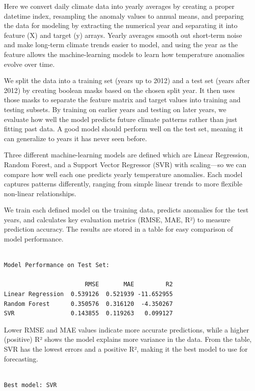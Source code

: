 \documentclass[
  letterpaper,
  DIV=11,
  numbers=noendperiod]{scrartcl}
\begin{document}
Here we convert daily climate data into yearly averages by creating a
proper datetime index, resampling the anomaly values to annual means,
and preparing the data for modeling by extracting the numerical year and
separating it into feature (X) and target (y) arrays. Yearly averages
smooth out short-term noise and make long-term climate trends easier to
model, and using the year as the feature allows the machine-learning
models to learn how temperature anomalies evolve over time.

We split the data into a training set (years up to 2012) and a test set
(years after 2012) by creating boolean masks based on the chosen split
year. It then uses those masks to separate the feature matrix and target
values into training and testing subsets. By training on earlier years
and testing on later years, we evaluate how well the model predicts
future climate patterns rather than just fitting past data. A good model
should perform well on the test set, meaning it can generalize to years
it has never seen before.

Three different machine-learning models are defined which are Linear
Regression, Random Forest, and a Support Vector Regressor (SVR) with
scaling---so we can compare how well each one predicts yearly
temperature anomalies. Each model captures patterns differently, ranging
from simple linear trends to more flexible non-linear relationships.

We train each defined model on the training data, predicts anomalies for
the test years, and calculates key evaluation metrics (RMSE, MAE, R²) to
measure prediction accuracy. The results are stored in a table for easy
comparison of model performance.

\begin{verbatim}

Model Performance on Test Set:

                       RMSE       MAE         R2
Linear Regression  0.539126  0.521939 -11.652955
Random Forest      0.350576  0.316120  -4.350267
SVR                0.143855  0.119263   0.099127
\end{verbatim}

Lower RMSE and MAE values indicate more accurate predictions, while a
higher (positive) R² shows the model explains more variance in the data.
From the table, SVR has the lowest errors and a positive R², making it
the best model to use for forecasting.

\begin{verbatim}

Best model: SVR
\end{verbatim}
\end{document}
